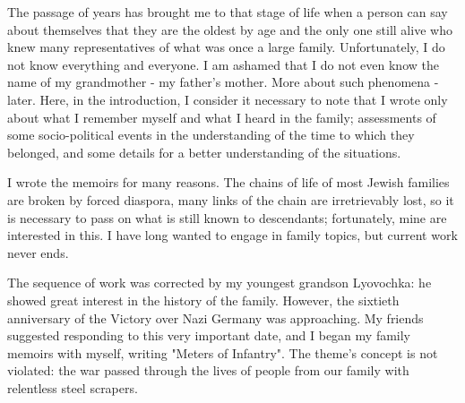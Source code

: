 \label{1-1}
The passage of years has brought me to that stage of life when a person can say about themselves that they are the oldest by age and the only one still alive who knew many representatives of what was once a large family. Unfortunately, I do not know everything and everyone. I am ashamed that I do not even know the name of my grandmother - my father's mother. More about such phenomena - later. Here, in the introduction, I consider it necessary to note that I wrote only about what I remember myself and what I heard in the family; assessments of some socio-political events in the understanding of the time to which they belonged, and some details for a better understanding of the situations.

\label{1-2}
I wrote the memoirs for many reasons. The chains of life of most Jewish families are broken by forced diaspora, many links of the chain are irretrievably lost, so it is necessary to pass on what is still known to descendants; fortunately, mine are interested in this. I have long wanted to engage in family topics, but current work never ends.

\label{2-1}
The sequence of work was corrected by my youngest grandson Lyovochka: he showed great interest in the history of the family. However, the sixtieth anniversary of the Victory over Nazi Germany was approaching. My friends suggested responding to this very important date, and I began my family memoirs with myself, writing "Meters of Infantry". The theme's concept is not violated: the war passed through the lives of people from our family with relentless steel scrapers.
